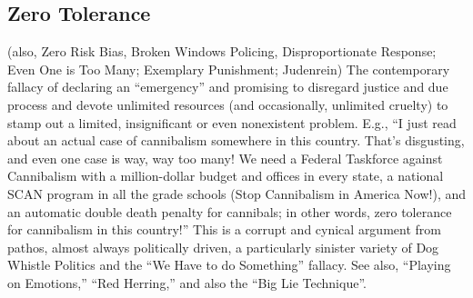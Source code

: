 \documentclass[10pt,a4paper,british]{article}
\begin{document}
\begin{multicols}{2}
    \subsection{Zero Tolerance} 

	(also, Zero Risk Bias, Broken Windows Policing, Disproportionate Response;
	Even One is Too Many; Exemplary Punishment; Judenrein) The contemporary
	fallacy of declaring an ``emergency'' and promising to disregard justice
	and due process and devote unlimited resources (and occasionally, unlimited
	cruelty) to stamp out a limited, insignificant or even nonexistent problem.
	E.g., ``I just read about an actual case of cannibalism somewhere in this
	country. That's disgusting, and even one case is way, way too many! We need
	a Federal Taskforce against Cannibalism with a million{-}dollar budget and
	offices in every state, a national SCAN program in all the grade schools
	(Stop Cannibalism in America Now!), and an automatic double death penalty
	for cannibals; in other words, zero tolerance for cannibalism in this
	country!'' This is a corrupt and cynical argument from pathos, almost
	always politically driven, a particularly sinister variety of Dog Whistle
	Politics and the ``We Have to do Something'' fallacy. See also, ``Playing
	on Emotions,'' ``Red Herring,'' and also the ``Big Lie Technique''.

\end{multicols}
\end{document}
